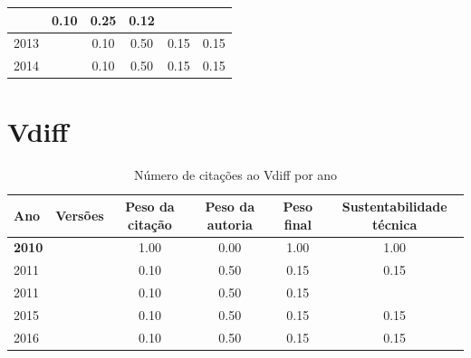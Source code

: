 \begin{table}[H]
\begin{tabular}{| l | c | c | c | c | c |}
          &
          0.10
          &
          0.25
          &
          0.12
          &
          \\
\hline
            2013
          &
          
          &
          0.10
          &
          0.50
          &
          0.15
          &
            {\color{red} 0.15}
          \\
\hline
            2014
          &
          
          &
          0.10
          &
          0.50
          &
          0.15
          &
            {\color{red} 0.15}
          \\
\hline
\end{tabular}
\end{table}



\section{Vdiff}


\begin{table}[H]
\caption{Número de citações ao Vdiff por ano}
\centering
\begin{tabular}{| l | c | c | c | c | c |}
  \hline
  Ano & Versões & Peso da citação & Peso da autoria & Peso final & Sustentabilidade técnica \\
  \hline
            {\bf 2010}
          &
          
          &
          1.00
          &
          0.00
          &
          1.00
          &
            {\color{blue} 1.00}
          \\
\hline
            2011
          &
          
          &
          0.10
          &
          0.50
          &
          0.15
          &
            {\color{red} 0.15}
          \\
            2011
          &
          
          &
          0.10
          &
          0.50
          &
          0.15
          &
          \\
\hline
            2015
          &
          
          &
          0.10
          &
          0.50
          &
          0.15
          &
            {\color{red} 0.15}
          \\
\hline
            2016
          &
          
          &
          0.10
          &
          0.50
          &
          0.15
          &
            {\color{red} 0.15}
          \\
\hline
\end{tabular}
\end{table}



